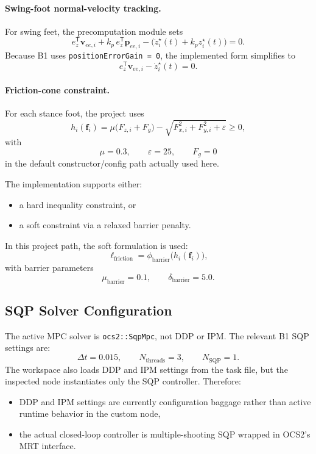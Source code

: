 \documentclass[11pt,a4paper]{article}
\newcommand{\vect}[1]{\bm{#1}}
\newcommand{\trans}{^{\mathsf T}}
\newcommand{\code}[1]{\texttt{#1}}
\begin{document}
\paragraph{Swing-foot normal-velocity tracking.}
For swing feet, the precomputation module sets
\begin{equation}
e_z\trans \vect{v}_{ee,i} + k_p \, e_z\trans \vect{p}_{ee,i}
- \big(\dot{z}^{\star}_i(t) + k_p z^{\star}_i(t)\big) = 0.
\end{equation}
Because B1 uses \code{positionErrorGain = 0}, the implemented form simplifies to
\begin{equation}
e_z\trans \vect{v}_{ee,i} - \dot{z}^{\star}_i(t) = 0.
\end{equation}

\paragraph{Friction-cone constraint.}
For each stance foot, the project uses
\begin{equation}
h_i(\vect{f}_i) =
\mu \big(F_{z,i} + F_g\big) -
\sqrt{F_{x,i}^2 + F_{y,i}^2 + \varepsilon} \ge 0,
\end{equation}
with
\begin{equation}
\mu = 0.3,\qquad \varepsilon = 25,\qquad F_g = 0
\end{equation}
in the default constructor/config path actually used here.

The implementation supports either:
\begin{itemize}[leftmargin=*]
\item a hard inequality constraint, or
\item a soft constraint via a relaxed barrier penalty.
\end{itemize}
In this project path, the soft formulation is used:
\begin{equation}
\ell_{\mathrm{friction}} = \phi_{\mathrm{barrier}}\big(h_i(\vect{f}_i)\big),
\end{equation}
with barrier parameters
\begin{equation}
\mu_{\mathrm{barrier}} = 0.1,\qquad \delta_{\mathrm{barrier}} = 5.0.
\end{equation}

\subsection{SQP Solver Configuration}
The active MPC solver is \code{ocs2::SqpMpc}, not DDP or IPM. The relevant B1 SQP settings are:
\begin{equation}
\Delta t = 0.015,\qquad
N_{\mathrm{threads}} = 3,\qquad
N_{\mathrm{SQP}} = 1.
\end{equation}
The workspace also loads DDP and IPM settings from the task file, but the inspected node instantiates only the SQP controller. Therefore:
\begin{itemize}[leftmargin=*]
\item DDP and IPM settings are currently configuration baggage rather than active runtime behavior in the custom node,
\item the actual closed-loop controller is multiple-shooting SQP wrapped in OCS2's MRT interface.
\end{itemize}
\end{document}
